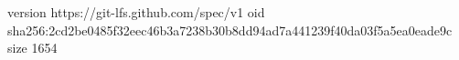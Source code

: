 version https://git-lfs.github.com/spec/v1
oid sha256:2cd2be0485f32eec46b3a7238b30b8dd94ad7a441239f40da03f5a5ea0eade9c
size 1654
